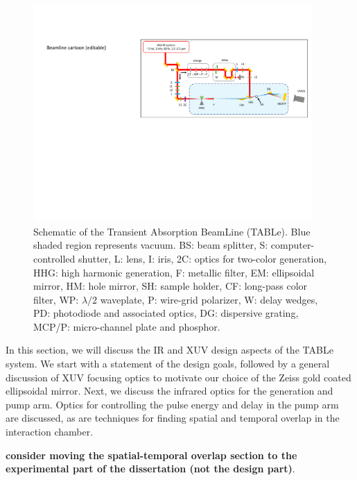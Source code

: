 \begin{figure}
	\centering
	\includegraphics[width=0.95\textwidth]{figures/chap2/beamline_schematic.pdf}
	\caption{Schematic of the Transient Absorption BeamLine (TABLe). Blue shaded region represents vacuum. BS: beam splitter, S: computer-controlled shutter, L: lens, I: iris, 2C: optics for two-color generation, HHG: high harmonic generation, F: metallic filter, EM: ellipsoidal mirror, HM: hole mirror, SH: sample holder, CF: long-pass color filter, WP: $\lambda/2$ waveplate, P: wire-grid polarizer, W: delay wedges, PD: photodiode and associated optics, DG: dispersive grating, MCP/P: micro-channel plate and phosphor.}
	\label{fig:beamline_schematic}
\end{figure}

In this section, we will discuss the IR and XUV design aspects of the TABLe system. We start with a statement of the design goals, followed by a general discussion of XUV focusing optics to motivate our choice of the Zeiss gold coated ellipsoidal mirror. Next, we discuss the infrared optics for the generation and pump arm. Optics for controlling the pulse energy and delay in the pump arm are discussed, as are techniques for finding spatial and temporal overlap in the interaction chamber.

\textbf{consider moving the spatial-temporal overlap section to the experimental part of the dissertation (not the design part)}.

